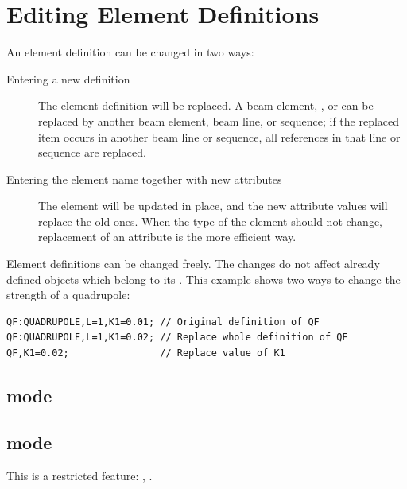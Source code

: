 \section{Editing Element Definitions}
\label{sec:elm-edit}
An element definition can be changed in two ways:
\begin{description}
\item[Entering a new definition]
  The element definition will be replaced.
  A beam element, , 
  or 
  can be replaced by another beam element, beam line, or sequence;
  if the replaced item occurs in another beam line or sequence,
  all references in that line or sequence are replaced.
\item[Entering the element name together with new attributes]
  The element will be updated in place,
  and the new attribute values will replace the old ones.
  When the type of the element should not change,
  replacement of an attribute is the more efficient way.
\end{description}
Element definitions can be changed freely.
The changes do not affect already defined objects which belong to
its .
This example shows two ways to change the strength of a quadrupole:
\begin{verbatim}
QF:QUADRUPOLE,L=1,K1=0.01; // Original definition of QF
QF:QUADRUPOLE,L=1,K1=0.02; // Replace whole definition of QF
QF,K1=0.02;                // Replace value of K1
\end{verbatim}
\subsection{\opalt mode}

\subsection{\opalcycl mode}

This is a restricted feature: \noopalt, \noopalcycl .

